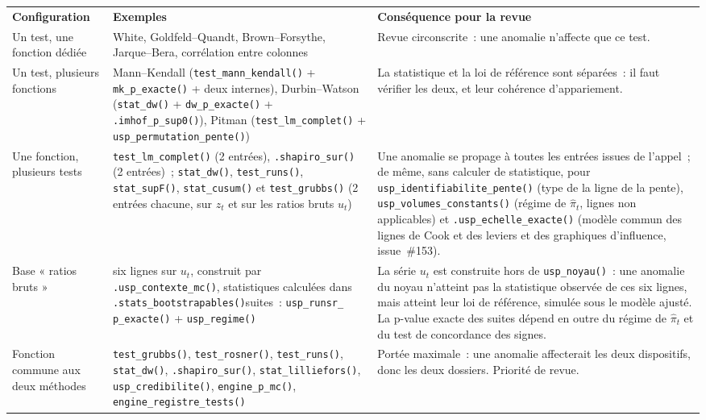 \documentclass[a4paper,11pt]{article}
\newcommand{\code}[1]{\texttt{\small #1}}
\begin{document}
\begin{center}
\small
{}
\begin{tabular}{@{}p{4.4cm}p{3.0cm}p{7.6cm}@{}}
\rowcolor{tableheader}
\textcolor{financeblue}{\textbf{Configuration}} &
\textcolor{financeblue}{\textbf{Exemples}} &
\textcolor{financeblue}{\textbf{Conséquence pour la revue}} \\
Un test, une fonction dédiée & White, Goldfeld--Quandt, Brown--Forsythe,
Jarque--Bera, corrélation entre colonnes & Revue circonscrite~: une anomalie
n'affecte que ce test. \\
Un test, plusieurs fonctions & Mann--Kendall (\code{test\_mann\_kendall()} +
\code{mk\_p\_exacte()} + deux internes), Durbin--Watson (\code{stat\_dw()} +
\code{dw\_p\_exacte()} + \code{.imhof\_p\_sup0()}), Pitman
(\code{test\_lm\_}\allowbreak\code{complet()} + \code{usp\_permutation\_}\allowbreak\code{pente()}) & La statistique et la loi de
référence sont séparées~: il faut vérifier les deux, et leur cohérence
d'appariement. \\
Une fonction, plusieurs tests & \code{test\_lm\_complet()} (2 entrées),
\code{.shapiro\_sur()} (2 entrées)~; \code{stat\_dw()}, \code{test\_runs()},
\code{stat\_supF()}, \code{stat\_cusum()} et \code{test\_grubbs()} (2 entrées
chacune, sur $z_t$ et sur les ratios bruts $u_t$) & Une anomalie se propage à toutes les
entrées issues de l'appel~; de même, sans calculer de statistique, pour
\code{usp\_identifiabilite\_pente()} (type de la ligne de la pente),
\code{usp\_volumes\_constants()} (régime de $\hat\pi_t$, lignes non applicables) et
\code{.usp\_echelle\_exacte()} (modèle commun des lignes de Cook et des leviers et des
graphiques d'influence, issue~\#153). \\
Base « ratios bruts » & six lignes sur $u_t$, construit par
\code{.usp\_contexte\_}\newline\code{mc()}, statistiques calculées dans
\code{.stats\_}\newline\code{bootstrapables()}\newline suites~: \code{usp\_runsr\_}\newline
\code{p\_exacte()} + \code{usp\_regime()} & La série $u_t$ est construite hors de \code{usp\_noyau()}~:
une anomalie du noyau n'atteint pas la statistique observée de ces six lignes, mais
atteint leur loi de référence, simulée sous le modèle ajusté. La p-value exacte des
suites dépend en outre du régime de $\hat\pi_t$ et du test de concordance des
signes. \\
Fonction commune aux deux méthodes & \code{test\_grubbs()},
\code{test\_rosner()}, \code{test\_runs()}, \code{stat\_dw()},
\code{.shapiro\_sur()}, \code{stat\_lilliefors()}, \code{usp\_credibilite()},
\code{engine\_p\_mc()}, \code{engine\_registre\_}\newline\code{tests()} &
Portée maximale~: une anomalie affecterait les deux dispositifs, donc les deux
dossiers. Priorité de revue. \\
\end{tabular}
\end{center}
\end{document}
